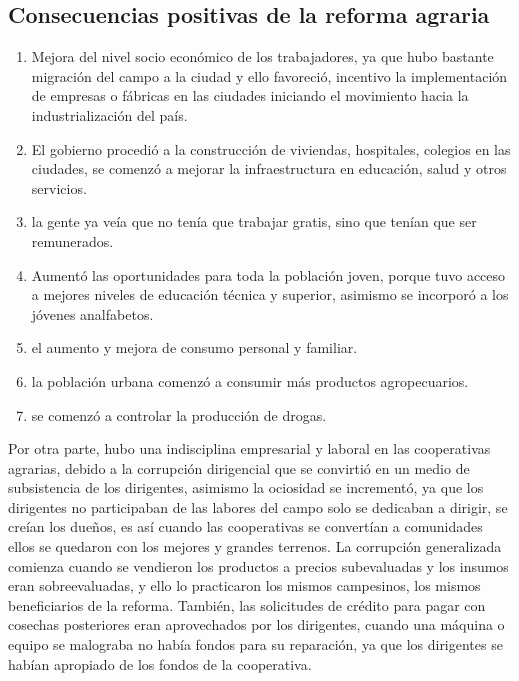 \documentclass[
  letterpaper,
  DIV=11,
  numbers=noendperiod]{scrartcl}
\begin{document}
\hypertarget{consecuencias-positivas-de-la-reforma-agraria}{%
\subsection{Consecuencias positivas de la reforma
agraria}\label{consecuencias-positivas-de-la-reforma-agraria}}

\begin{enumerate}
\def\labelenumi{\arabic{enumi}.}
\item
  Mejora del nivel socio económico de los trabajadores, ya que hubo
  bastante migración del campo a la ciudad y ello favoreció, incentivo
  la implementación de empresas o fábricas en las ciudades iniciando el
  movimiento hacia la industrialización del país.
\item
  El gobierno procedió a la construcción de viviendas, hospitales,
  colegios en las ciudades, se comenzó a mejorar la infraestructura en
  educación, salud y otros servicios.
\item
  la gente ya veía que no tenía que trabajar gratis, sino que tenían que
  ser remunerados.
\item
  Aumentó las oportunidades para toda la población joven, porque tuvo
  acceso a mejores niveles de educación técnica y superior, asimismo se
  incorporó a los jóvenes analfabetos.
\item
  el aumento y mejora de consumo personal y familiar.
\item
  la población urbana comenzó a consumir más productos agropecuarios.
\item
  se comenzó a controlar la producción de drogas.
\end{enumerate}

Por otra parte, hubo una indisciplina empresarial y laboral en las
cooperativas agrarias, debido a la corrupción dirigencial que se
convirtió en un medio de subsistencia de los dirigentes, asimismo la
ociosidad se incrementó, ya que los dirigentes no participaban de las
labores del campo solo se dedicaban a dirigir, se creían los dueños, es
así cuando las cooperativas se convertían a comunidades ellos se
quedaron con los mejores y grandes terrenos. La corrupción generalizada
comienza cuando se vendieron los productos a precios subevaluadas y los
insumos eran sobreevaluadas, y ello lo practicaron los mismos
campesinos, los mismos beneficiarios de la reforma. También, las
solicitudes de crédito para pagar con cosechas posteriores eran
aprovechados por los dirigentes, cuando una máquina o equipo se
malograba no había fondos para su reparación, ya que los dirigentes se
habían apropiado de los fondos de la cooperativa.
\end{document}
